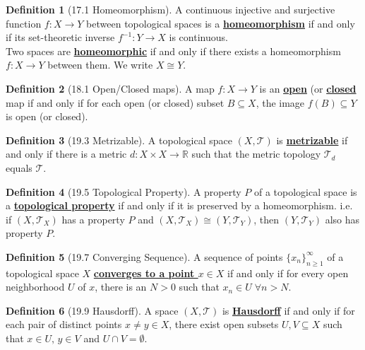 \documentclass{article}
\newcommand{\R}{\ensuremath{\mathbb{R}}}
\newcommand{\nbd}{neighborhood}
\newcommand{\Iff}{if and only if}
\newcommand{\ts}{topological space}
\newcommand{\es}{\ensuremath{\emptyset}}
\newcommand{\define}[1]{\textbf{\underline{#1}}}
\newcommand{\func}[3]{\ensuremath{#1: #2 \to #3}}
\newcommand{\tp}{\ensuremath{\mathscr{T}}}
\newcommand{\Ts}[2]{\ensuremath{(#1,#2)}}
\newcommand{\inter}{\cap}
\renewcommand{\Subset}{\subseteq}
\theoremstyle{definition}
\newtheorem*{defn}{Definition}
\theoremstyle{remark}
\begin{document}
{        \begin{defn}[17.1 Homeomorphism]
            A continuous injective and surjective function $\func{f}{X}{Y}$ between topological spaces is a \define{homeomorphism} \Iff{} its set-theoretic inverse $\func{f^{-1}}{Y}{X}$ is continuous.\\
            Two spaces are \define{homeomorphic} \Iff{} there exists a homeomorphism $\func{f}{X}{Y}$ between them. We write $X \cong Y$.
        \end{defn}
        
        \begin{defn}[18.1 Open/Closed maps]
            A map $\func{f}{X}{Y}$ is an \define{open} (or \define{closed} map \Iff{} for each open (or closed) subset $B \Subset X$, the image $f(B) \Subset Y$ is open (or closed).
        \end{defn}
        
        \begin{defn}[19.3 Metrizable]
            A topological space $\Ts{X}{\tp}$ is \define{metrizable} \Iff{} there is a metric $\func{d}{X\times X}{\R}$ such that the metric topology $\tp_d$ equals $\tp$.
        \end{defn}
        
        \begin{defn}[19.5 Topological Property]
            A property \define{$P$} of a \ts{} is a \define{topological property} \Iff{} it is preserved by a homeomorphism. i.e. if $\Ts{X}{\tp_X}$ has a property $P$ and $\Ts{X}{\tp_X} \cong \Ts{Y}{\tp_Y}$, then $\Ts{Y}{\tp_Y}$ also has property $P$.
        \end{defn}
        
        \begin{defn}[19.7 Converging Sequence]
            A sequence of points $\{x_n\}_{n\geq1}^\infty$ of a \ts{} $X$ \define{converges to a point $x \in X$} \Iff{} for every open \nbd{} $U$ of $x$, there is an $N>0$ such that $x_n \in U \; \forall n>N$.  
        \end{defn}
        
        \begin{defn}[19.9 Hausdorff]
            A space $\Ts{X}{\tp}$ is \define{Hausdorff} \Iff{} for each pair of distinct points $x\neq y \in X$, there exist open subsets $U,V \Subset X$ such that $x \in U, \, y\in V$ and $U \inter V =  \es$.
        \end{defn}
        
}
\end{document}
